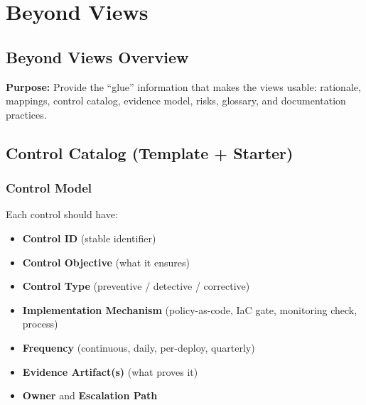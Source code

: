 \documentclass[11pt]{report}
\begin{document}
\clearpage

\chapter{Beyond Views}
\section{Beyond Views Overview}
\begin{viewbox}
\textbf{Purpose:} Provide the “glue” information that makes the views usable: rationale, mappings,
control catalog, evidence model, risks, glossary, and documentation practices.
\end{viewbox}

\section{Control Catalog (Template + Starter)}
\subsection{Control Model}
Each control should have:
\begin{itemize}
  \item \textbf{Control ID} (stable identifier)
  \item \textbf{Control Objective} (what it ensures)
  \item \textbf{Control Type} (preventive / detective / corrective)
  \item \textbf{Implementation Mechanism} (policy-as-code, IaC gate, monitoring check, process)
  \item \textbf{Frequency} (continuous, daily, per-deploy, quarterly)
  \item \textbf{Evidence Artifact(s)} (what proves it)
  \item \textbf{Owner} and \textbf{Escalation Path}
\end{itemize}
\end{document}
